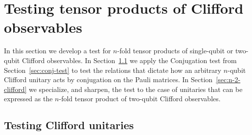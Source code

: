 \documentclass[11pt]{article}
\newtheorem{lemma}[theorem]{Lemma}
\theoremstyle{remark}
\theoremstyle{definition}
\newcommand{\Id}{\ensuremath{\mathop{\rm Id}\nolimits}}
\newcommand{\setft}[1]{\mathrm{#1}}
\newcommand{\Obs}{\setft{Obs}}
\newcommand{\eps}{\varepsilon}
\newcommand{\pbt}{\textsc{pbt}}
\begin{document}
%
%

\section{Testing tensor products of Clifford observables}
\label{sec:clifford}

In this section we develop a test for $n$-fold tensor products of single-qubit or two-qubit Clifford observables. In Section~\ref{sec:n-clifford} we apply the Conjugation test from Section~\ref{sec:conj-test}  to test the relations that dictate how an arbitrary $n$-qubit Clifford unitary acts by conjugation on the Pauli matrices. In Section~\ref{sec:n-2-clifford} we specialize, and sharpen, the test to the case of unitaries that can be expressed as the $n$-fold tensor product of two-qubit Clifford observables.  


\subsection{Testing Clifford unitaries}
\label{sec:n-clifford}
\end{document}

